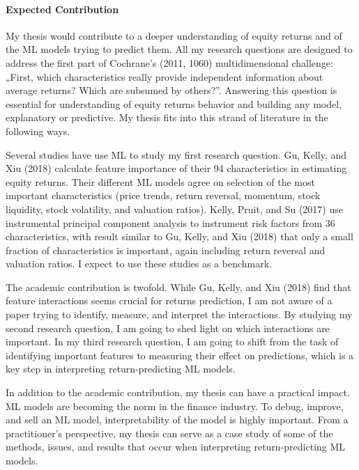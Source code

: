 \paragraph{Expected Contribution}

My thesis would contribute to a deeper understanding of equity returns and of the ML models trying to predict them. All my research questions are designed to address the first part of Cochrane’s (2011, 1060) multidimensional challenge: „First, which characteristics really provide independent information about average returns? Which are subsumed by others?”. Answering this question is essential for understanding of equity returns behavior and building any model, explanatory or predictive. My thesis fits into this strand of literature in the following ways.  

Several studies have use ML to study my first research question. Gu, Kelly, and Xiu (2018) calculate feature importance of their 94 characteristics in estimating equity returns. Their different ML models agree on selection of the most important characteristics (price trends, return reversal, momentum, stock liquidity, stock volatility, and valuation ratios). Kelly, Pruit, and Su (2017) use instrumental principal component analysis to instrument risk factors from 36 characteristics, with result similar to Gu, Kelly, and Xiu (2018) that only a small fraction of characteristics is important, again including return reversal and valuation ratios. I expect to use these studies as a benchmark.  

The academic contribution is twofold. While Gu, Kelly, and Xiu (2018) find that feature interactions seems crucial for returns prediction, I am not aware of a paper trying to identify, measure, and interpret the interactions. By studying my second research question, I am going to shed light on which interactions are important. In my third research question, I am going to shift from the task of identifying important features to measuring their effect on predictions, which is a key step in interpreting return-predicting ML models.   

In addition to the academic contribution, my thesis can have a practical impact. ML models are becoming the norm in the finance industry. To debug, improve, and sell an ML model, interpretability of the model is highly important. From a practitioner’s perspective, my thesis can serve as a case study of some of the methods, issues, and results that occur when interpreting return-predicting ML models.

